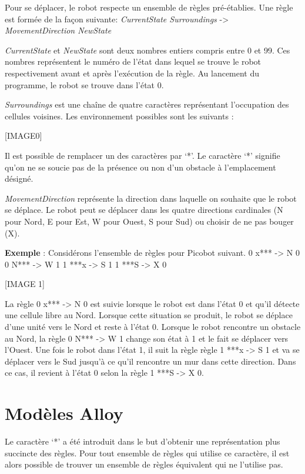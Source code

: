 \documentclass{article}
\begin{document}
Pour se déplacer, le robot respecte un ensemble de règles pré-établies. Une règle est formée de la façon suivante:
\textit{CurrentState Surroundings} -> \textit{MovementDirection NewState}

\textit{CurrentState} et \textit{NewState} sont deux nombres entiers compris entre 0 et 99. Ces nombres représentent le numéro de l’état dans lequel se trouve le robot respectivement avant et après l’exécution de la règle. Au lancement du programme, le robot se trouve dans l’état 0.

\textit{Surroundings} est une chaîne de quatre caractères représentant l’occupation des cellules voisines. Les environnement possibles sont les suivants : 

[IMAGE0]

Il est possible de remplacer un des caractères par ‘*’. Le caractère ‘*’ signifie qu’on ne se soucie pas de la présence ou non d’un obstacle à l’emplacement désigné.

\textit{MovementDirection} représente la direction dans laquelle on souhaite que le robot se déplace. Le robot peut se déplacer dans les quatre directions cardinales (N pour Nord, E pour Est, W pour Ouest, S pour Sud) ou choisir de ne pas bouger (X).

\textbf{Exemple} : Considérons l’ensemble de règles pour Picobot suivant.
0 x*** -> N 0
0 N*** -> W 1
1 ***x -> S 1
1 ***S -> X 0

[IMAGE 1]

La règle 0 x*** -> N 0 est suivie lorsque le robot est dans l'état 0 et qu'il détecte une cellule libre au Nord. Lorsque cette situation se produit, le robot se déplace d'une unité vers le Nord et reste à l'état 0. Lorsque le robot rencontre un obstacle au Nord, la règle 0 N*** -> W 1 change son état à 1 et le fait se déplacer vers l’Ouest. Une fois le robot dans l'état 1, il suit la règle règle 1 ***x -> S 1 et va se déplacer vers le Sud jusqu'à ce qu'il rencontre un mur dans cette direction. Dans ce cas, il revient à l'état 0 selon la règle 1 ***S -> X 0.

\section{Modèles Alloy}
\label{sec:mod_alloy}
Le caractère ‘*’ a été introduit dans le but d’obtenir une représentation plus succincte des règles. Pour tout ensemble de règles qui utilise ce caractère, il est alors possible de trouver un ensemble de règles équivalent qui ne l’utilise pas.
\end{document}

